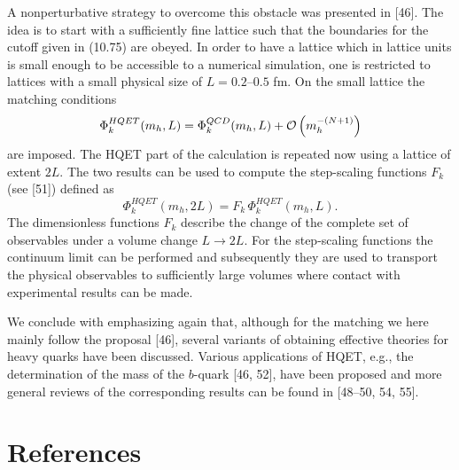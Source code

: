 A nonperturbative strategy to overcome this obstacle was presented in [46]. The
idea is to start with a sufficiently fine lattice such that the boundaries for
the cutoff given in (10.75) are obeyed. In order to have a lattice which in
lattice units is small enough to be accessible to a numerical simulation, one
is restricted to lattices with a small physical size of
$L = 0.2$--$0.5$ fm. On the small lattice the matching conditions
\begin{equation}
  \Phi_k^{HQET}(m_h, L) = \Phi_k^{QCD}(m_h, L) + \mathcal{O}\left(m_h^{-(N+1)}\right)
\end{equation}
are imposed. The HQET part of the calculation is repeated now using a lattice
of extent $2L$. The two results can be used to compute the step-scaling
functions $F_k$ (see [51]) defined as
\begin{equation}
  \Phi_k^{HQET}(m_h, 2L) = F_k\, \Phi_k^{HQET}(m_h, L) .
\end{equation}
The dimensionless functions $F_k$ describe the change of the complete set of
observables under a volume change $L \to 2L$. For the step-scaling functions
the continuum limit can be performed and subsequently they are used to
transport the physical observables to sufficiently large volumes where contact
with experimental results can be made.

We conclude with emphasizing again that, although for the matching we here
mainly follow the proposal [46], several variants of obtaining effective
theories for heavy quarks have been discussed. Various applications of HQET,
e.g., the determination of the mass of the $b$-quark [46, 52], have been
proposed and more general reviews of the corresponding results can be found in
[48--50, 54, 55].

\section*{References}

